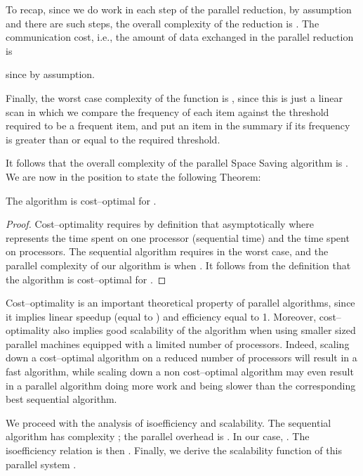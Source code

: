 \documentclass[final,3p,times]{elsarticle}
\newcommand\noi{\noindent}
\begin{document}
To recap, since we do  work in each step of the parallel reduction,  by assumption and there are  such steps, the overall complexity of the reduction is  . The communication cost, i.e., the amount of data exchanged in the parallel reduction is 



\noi since  by assumption.

Finally, the worst case complexity of the  function is , since this is just a linear scan in which we compare the frequency of each item against the threshold required to be a frequent item, and put an item in the   summary if its frequency is greater than or equal to the required threshold.

It follows that the overall  complexity of the parallel Space Saving algorithm is . We are now in the position to state the following Theorem:

\begin{thm}
The algorithm is cost--optimal for .
\end{thm}

\begin{proof}
Cost--optimality requires by definition that asymptotically  where   represents the time spent on one processor (sequential time) and  the time spent on
 processors. The sequential algorithm requires  in the worst case, and the parallel complexity of our algorithm is  when . It follows from
the definition that the algorithm is cost--optimal for .
\end{proof}

Cost--optimality is an important theoretical property of parallel algorithms, since it implies linear speedup (equal to ) and efficiency equal to 1. Moreover,  cost--optimality also implies good scalability of the algorithm when using smaller sized parallel machines equipped with a limited number of processors. Indeed, scaling down a cost--optimal algorithm on a reduced number of processors will result in a fast algorithm, while scaling down a non cost--optimal algorithm may even result in a parallel algorithm doing more work and being slower than the corresponding best sequential algorithm. 

We proceed with the analysis of isoefficiency and scalability. The sequential algorithm has complexity ; the parallel overhead is . In our case,  .  The isoefficiency relation \cite{Grama93} is then . Finally, we derive the scalability function of this parallel system
\cite{Quinn03}.
\end{document}
